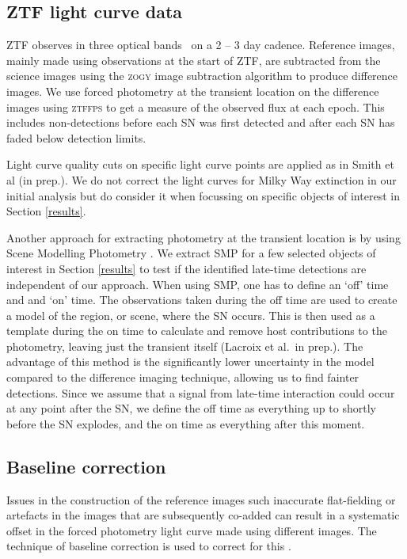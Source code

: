 \documentclass[a4paper,oneside,12pt, class=Latex/Classes/PhDthesisPSnPDF, crop=false]{standalone}
\begin{document}
\subsection{ZTF light curve data}
\label{lc_data}
ZTF observes in three optical bands \ztfg\ztfr\ztfi\ on a 2 -- 3 day cadence. Reference images, mainly made using observations at the start of ZTF, are subtracted from the science images using the \textsc{zogy} image subtraction algorithm \citep{ZOGY} to produce difference images. We use forced photometry at the transient location on the difference images using \textsc{ztffps} \citep{ztffps} to get a measure of the observed flux at each epoch. This includes non-detections before each SN was first detected and after each SN has faded below detection limits. 

 Light curve quality cuts on specific light curve points are applied as in Smith et al (in prep.). We do not correct the light curves for Milky Way extinction in our initial analysis but do consider it when focussing on specific objects of interest in Section \ref{results}. 

Another approach for extracting photometry at the transient location is by using Scene Modelling Photometry \citep[SMP;][]{Holtzmann_SMP}. We extract SMP for a few selected objects of interest in Section \ref{results} to test if the identified late-time detections are independent of our approach. When using SMP, one has to define an `off' time and and `on' time. The observations taken during the off time are used to create a model of the region, or scene, where the SN occurs. This is then used as a template during the on time to calculate and remove host contributions to the photometry, leaving just the transient itself (Lacroix et al.~in prep.). The advantage of this method is the significantly lower uncertainty in the model compared to the difference imaging technique, allowing us to find fainter detections. Since we assume that a signal from late-time interaction could occur at any point after the SN, we define the off time as everything up to shortly before the SN explodes, and the on time as everything after this moment.


\subsection{Baseline correction}
 Issues in the construction of the reference images such inaccurate flat-fielding or artefacts in the images that are subsequently co-added can result in a systematic offset in the forced photometry light curve made using different images. The technique of baseline correction is used to correct for this \citep{Yao_baseline_corr,Miller_baseline_corr}. 
\end{document}
